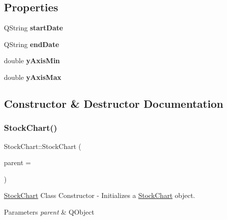 \subsection*{Properties}
\begin{DoxyCompactItemize}
\item 
\mbox{\label{class_stock_chart_add7099e870c86ce5a1c9ba88bced379c}} 
Q\+String {\bfseries start\+Date}
\item 
\mbox{\label{class_stock_chart_aab43c54ca8f5aafcb68170b7684775f4}} 
Q\+String {\bfseries end\+Date}
\item 
\mbox{\label{class_stock_chart_ae2c25f0548c61c72c2467b4bbf519a09}} 
double {\bfseries y\+Axis\+Min}
\item 
\mbox{\label{class_stock_chart_a77e182d1098f84f08bbd23bd0e2dbf9a}} 
double {\bfseries y\+Axis\+Max}
\end{DoxyCompactItemize}


\subsection{Constructor \& Destructor Documentation}
\mbox{\label{class_stock_chart_a93b8197ae88bda092ea1fd3a123ed7ea}} 
\subsubsection{\texorpdfstring{Stock\+Chart()}{StockChart()}}
{\footnotesize\ttfamily Stock\+Chart\+::\+Stock\+Chart (\begin{DoxyParamCaption}\item[{Q\+Object $\ast$}]{parent = {} }\end{DoxyParamCaption})\hspace{0.3cm}{\ttfamily [explicit]}}



\hyperlink{class_stock_chart}{Stock\+Chart} Class Constructor -\/ Initializes a \hyperlink{class_stock_chart}{Stock\+Chart} object. 


\begin{DoxyParams}{Parameters}
{\em parent} & Q\+Object \\
\hline
\end{DoxyParams}


